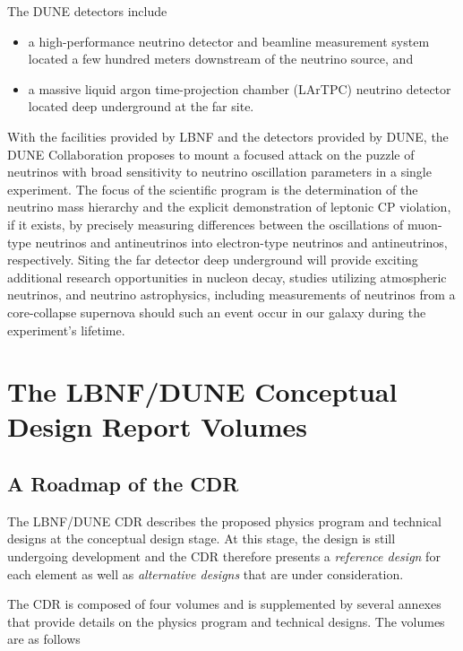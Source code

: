 The DUNE detectors include
\begin{itemize}
\item a high-performance neutrino detector and beamline  
measurement system
located a few hundred meters downstream of the neutrino source, and
\item a massive liquid argon time-projection chamber (LArTPC) neutrino detector located deep underground at the far site.
\end{itemize}

With the facilities provided by LBNF and the detectors provided by
DUNE, the DUNE Collaboration proposes to mount a focused attack on the
puzzle of neutrinos with broad sensitivity to neutrino oscillation
parameters in a single experiment.  The focus of the scientific
program is the determination of the neutrino mass hierarchy and the
explicit demonstration of leptonic CP violation, if it exists, by
precisely measuring differences between the oscillations of muon-type
neutrinos and antineutrinos into electron-type neutrinos and
antineutrinos, respectively. Siting the far detector deep underground
will provide exciting additional research opportunities in nucleon
decay, studies utilizing atmospheric neutrinos, and neutrino
astrophysics, including measurements of neutrinos from a core-collapse
supernova should such an event occur in our galaxy during the
experiment's lifetime.

\section{The LBNF/DUNE Conceptual Design Report Volumes}

\subsection{A Roadmap of the CDR}

The LBNF/DUNE CDR describes the proposed physics program and 
technical designs at the conceptual design stage.  At this stage, the design is
still undergoing development and the CDR therefore presents a \textit{reference design} 
for each element as well as \textit{alternative designs} that are under consideration.

The CDR is composed of four volumes and is supplemented by several annexes that 
provide details on the physics program and technical designs. The volumes are as follows

